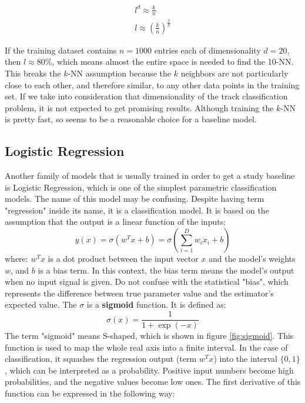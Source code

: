 \begin{align}
l^{d} \approx \frac{k}{n} \nonumber \\
l \approx (\frac{k}{n})^{\frac{1}{d}}
\end{align}

If the training dataset contains $n=1000$ entries each of dimensionality $d=20$, then $l \approx 80\%$, which means almost the entire space is needed to find the 10-NN. This breaks the $k$-NN  assumption because the $k$ neighbors are not particularly close to each other, and therefore similar, to any other data points in the training set. 
If we take into consideration that dimensionality of the track classification problem, it is not expected to get promising results. Although training the $k$-NN is pretty fast, so seems to be a reasonable choice for a baseline model. 

\subsection{Logistic Regression}
\label{sec:LogReg}
Another family of models that is usually trained in order to get a study baseline is Logistic Regression, which is one of the simplest parametric classification models. The name of this model may be confusing. Despite having term "regression" inside its name, it is a classification model. It is based on the assumption that the output is a linear function of the inputs: 
\begin{equation}
\label{eq:logreg}
    y(x) = \sigma (w^{T}x + b) = \sigma \left(\sum_{i=1}^{D}w_ix_i +b\right) 
\end{equation}
where: $w^{T}x$ is a dot product between the input vector $x$ and the model's weights $w$, and $b$ is a bias term. In this context, the bias term means the model's output when no input signal is given. Do not confuse with the statistical "bias", which represents the difference between true parameter value and the estimator's expected value. The $\sigma$ is a \textbf{sigmoid} function. It is defined as: 
\begin{equation}
\label{eg:sigmoid}
    \sigma(x) = \frac{1}{1+\exp(-x)}
\end{equation}
The term "sigmoid" means S-shaped, which is shown in figure \ref{fig:sigmoid}. This function is used to map the whole real axis into a finite interval. In the case of classification, it squashes the regression output (term $w^{T}x$) into the interval $\{0,1\}$, which can be interpreted as a probability. Positive input numbers become high probabilities, and the negative values become low ones. 
The first derivative of this function can be expressed in the following way:

